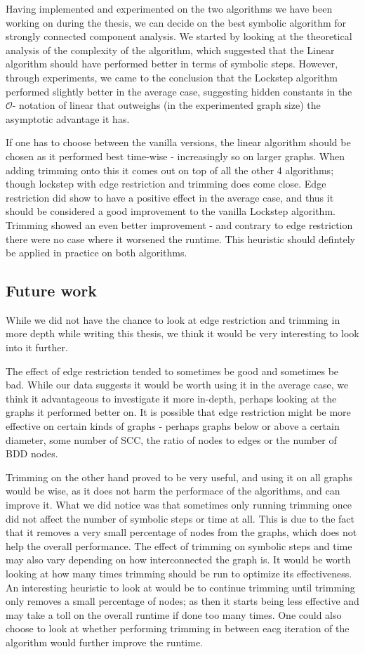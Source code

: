 \documentclass[../master/master.tex]{subfiles}
\begin{document}
Having implemented and experimented on the two algorithms we have been working on during the thesis, we can decide on the best symbolic algorithm for strongly connected component analysis. We started by looking at the theoretical analysis of the complexity of the algorithm, which suggested that the Linear algorithm should have performed better in terms of symbolic steps. However, through experiments, we came to the conclusion that the Lockstep algorithm performed slightly better in the average case, suggesting hidden constants in the $\mathcal{O}$- notation of linear that outweighs (in the experimented graph size) the asymptotic advantage it has.

If one has to choose between the vanilla versions, the linear algorithm should be chosen as it performed best time-wise - increasingly so on larger graphs. When adding trimming onto this it comes out on top of all the other 4 algorithms; though lockstep with edge restriction and trimming does come close. Edge restriction did show to have a positive effect in the average case, and thus it should be considered a good improvement to the vanilla Lockstep algorithm. Trimming showed an even better improvement - and contrary to edge restriction there were no case where it worsened the runtime. This heuristic should defintely be applied in practice on both algorithms.

\subsection{Future work}
While we did not have the chance to look at edge restriction and trimming in more depth while writing this thesis, we think it would be very interesting to look into it further.

The effect of edge restriction tended to sometimes be good and sometimes be bad. While our data suggests it would be worth using it in the average case, we think it advantageous to investigate it more in-depth, perhaps looking at the graphs it performed better on. It is possible that edge restriction might be more effective on certain kinds of graphs - perhaps graphs below or above a certain diameter, some number of SCC, the ratio of nodes to edges or the number of BDD nodes.

Trimming on the other hand proved to be very useful, and using it on all graphs would be wise, as it does not harm the performace of the algorithms, and can improve it. What we did notice was that sometimes only running trimming once did not affect the number of symbolic steps or time at all. This is due to the fact that it removes a very small percentage of nodes from the graphs, which does not help the overall performance. The effect of trimming on symbolic steps and time may also vary depending on how interconnected the graph is. It would be worth looking at how many times trimming should be run to optimize its effectiveness. An interesting heuristic to look at would be to continue trimming until trimming only removes a small percentage of nodes; as then it starts being less effective and may take a toll on the overall runtime if done too many times. One could also choose to look at whether performing trimming in between eacg iteration of the algorithm would further improve the runtime.
\end{document}
